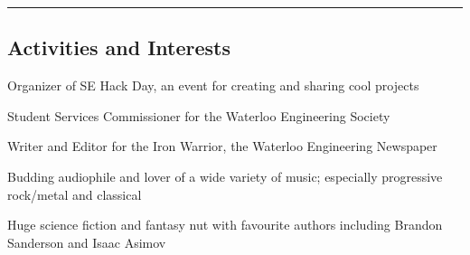 \documentclass[10pt,letterpaper]{article}
\begin{document}
\hrule
\vspace{-0.4em}
\subsection*{Activities and Interests}

\begin{itemize*}
\item Organizer of SE Hack Day, an event for creating and sharing cool projects
\item Student Services Commissioner for the Waterloo Engineering Society
\item Writer and Editor for the Iron Warrior, the Waterloo Engineering Newspaper
\item Budding audiophile and lover of a wide variety of music; especially progressive rock/metal and classical
\item Huge science fiction and fantasy nut with favourite authors including Brandon Sanderson and Isaac Asimov

\end{itemize*}
\end{document}
